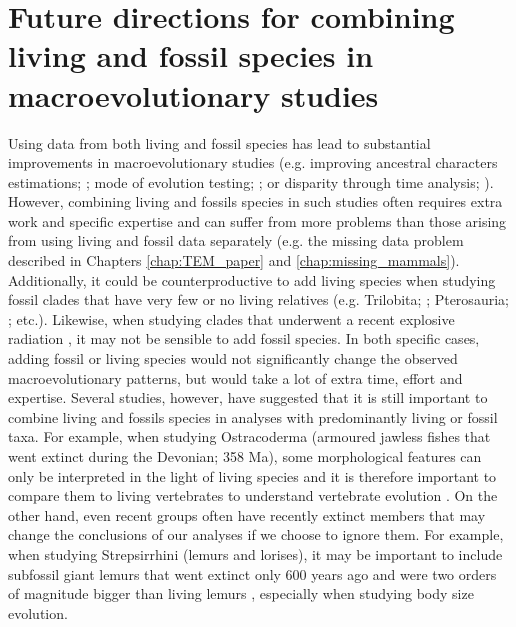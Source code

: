 \section{Future directions for combining living and fossil species in macroevolutionary studies}
Using data from both living and fossil species has lead to substantial improvements in macroevolutionary studies (e.g. improving ancestral characters estimations; \citealt{Finarelli2006}; mode of evolution testing; \citealt{Slater2012MEE,pant2014complex}; or disparity through time analysis; \citealt{Mitchell2015}).
However, combining living and fossils species in such studies often requires extra work and specific expertise \citep[e.g. the study by][gathered statistic, bioinformatic, phylogenetic and palaeontology experts]{ronquista2012} and can suffer from more problems than those arising from using living and fossil data separately (e.g. the missing data problem described in Chapters \ref{chap:TEM_paper} and \ref{chap:missing_mammals}).
Additionally, it could be counterproductive to add living species when studying fossil clades that have very few or no living relatives (e.g. Trilobita; \citealt{hopkinsdecoupling2013}; Pterosauria; \citealt{Butler2012}; etc.).
Likewise, when studying clades that underwent a recent explosive radiation \citep[e.g. Cichlidae;][]{Genner01052007}, it may not be sensible to add fossil species.
In both specific cases, adding fossil or living species would not significantly change the observed macroevolutionary patterns, but would take a lot of extra time, effort and expertise.
Several studies, however, have suggested that it is still important to combine living and fossils species in analyses with predominantly living or fossil taxa.
For example, when studying Ostracoderma (armoured jawless fishes that went extinct during the Devonian; 358 Ma), some morphological features can only be interpreted in the light of living species and it is therefore important to compare them to living vertebrates to understand vertebrate evolution \citep{Janvier2015}.
On the other hand, even recent groups often have recently extinct members that may change the conclusions of our analyses if we choose to ignore them.
For example, when studying Strepsirrhini (lemurs and lorises), it may be important to include subfossil giant lemurs that went extinct only 600 years ago and were two orders of magnitude bigger than living lemurs \citep{goodman2003introduction}, especially when studying body size evolution.

